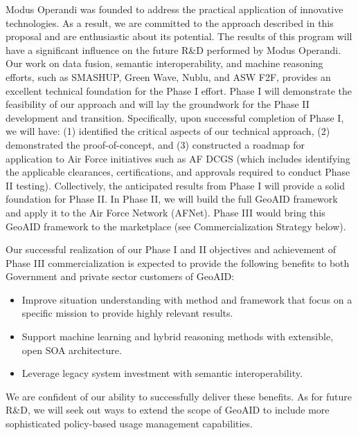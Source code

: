 \documentclass{sbir}
\begin{document}
Modus Operandi was founded to address the practical application of innovative technologies. As a result, we are committed to the approach described in this proposal and are enthusiastic about its potential. The results of this program will have a significant influence on the future R\&D performed by Modus Operandi. Our work on data fusion, semantic interoperability, and machine reasoning efforts, such as SMASHUP, Green Wave, Nublu, and ASW F2F, provides an excellent technical foundation for the Phase I effort. Phase I will demonstrate the feasibility of our approach and will lay the groundwork for the Phase II development and transition. Specifically, upon successful completion of Phase I, we will have: (1) identified the critical aspects of our technical approach, (2) demonstrated the proof-of-concept, and (3) constructed a roadmap for application to Air Force initiatives such as AF DCGS (which includes identifying the applicable clearances, certifications, and approvals required to conduct Phase II testing). Collectively, the anticipated results from Phase I will provide a solid foundation for Phase II. In Phase II, we will build the full GeoAID framework and apply it to the Air Force Network (AFNet). Phase III would bring this GeoAID framework to the marketplace (see Commercialization Strategy below).

Our successful realization of our Phase I and II objectives and achievement of Phase III commercialization is expected to provide the following benefits to both Government and private sector customers of GeoAID:
\begin{itemize}
  \item Improve situation understanding with method and framework that focus on a specific mission to provide highly relevant results.
  \item Support machine learning and hybrid reasoning methods with extensible, open SOA architecture.
  \item Leverage legacy system investment with semantic interoperability.
\end{itemize}
We are confident of our ability to successfully deliver these benefits. As for future R\&D, we will seek out ways to extend the scope of GeoAID to include more sophisticated policy-based usage management capabilities.

\label{commercialization}
\end{document}

